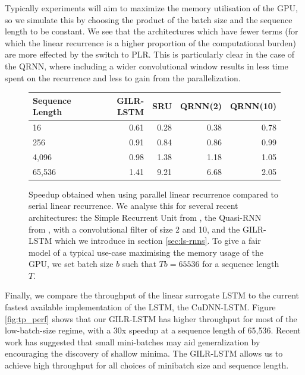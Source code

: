 \documentclass{article}
\begin{document}
Typically experiments will aim to maximize the memory
utilisation of the GPU, so we simulate this by choosing the product of the batch
size and the sequence length to be constant. We see that the architectures which
have fewer terms (for which the linear recurrence is a higher proportion of the
computational burden) are more effected by the switch to PLR.  This is
particularly clear in the case of the QRNN, where including a wider
convolutional window results in less time spent on the recurrence and less to
gain from the parallelization.
\begin{figure}
\begin{center}
  \begin{tabular}{@{}lrrrr@{}}
    \label{table:rnn-throughput}
Sequence Length & GILR-LSTM & SRU & QRNN(2) & QRNN(10)\\ \midrule
16 & 0.61 & 0.28 & 0.38 & 0.78\\
256 & 0.91 & 0.84 & 0.86 & 0.99\\
4,096 & 0.98 & 1.38 & 1.18 & 1.05\\
65,536 & 1.41 & 9.21 & 6.68 & 2.05\\ \bottomrule
  \end{tabular}  
\end{center}
\caption{Speedup obtained when using parallel linear recurrence compared to
  serial linear recurrence. We analyse this for several recent architectures:
  the Simple Recurrent Unit from \cite{lei2017}, the Quasi-RNN from
  \cite{bradbury2017quasi}, with a convolutional filter of size 2 and 10, and
  the GILR-LSTM which we introduce in section \ref{sec:ls-rnns}. To give a fair
  model of a typical use-case maximising the memory usage of the GPU, we set
  batch size \(b\) such that \(Tb = 65536\) for a sequence length \(T\).}
\end{figure}

Finally, we compare the throughput of the linear surrogate LSTM to the current
fastest available implementation of the LSTM, the CuDNN-LSTM. Figure
\ref{fig:tp_perf} shows that our GILR-LSTM has higher throughput for most of the
low-batch-size regime, with a 30x speedup at a sequence length of 65,536. Recent
work \cite{keskar2017large} has suggested that small mini-batches may aid
generalization by encouraging the discovery of shallow minima. The GILR-LSTM
allows us to achieve high throughput for all choices of minibatch size and
sequence length.
\end{document}
